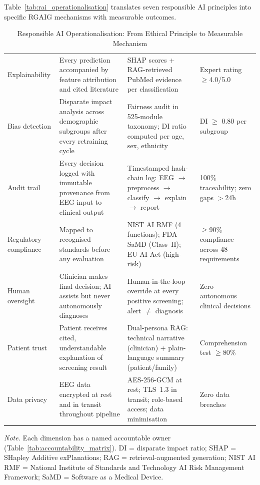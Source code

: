 Table~\ref{tab:rai_operationalisation} translates seven responsible AI principles into specific RGAIG mechanisms with measurable outcomes.

\begin{table}[H]
\tablestripes
\tablefontsize
\caption[Responsible AI Operationalisation]{Responsible AI Operationalisation: From Ethical Principle to Measurable Mechanism}
\begin{tabularx}{\textwidth}{@{} p{2cm} L L p{2.5cm} @{}}
\toprule
{} &  &  &  \\
\midrule
Explainability & Every prediction accompanied by feature attribution and cited literature & SHAP scores + RAG-retrieved PubMed evidence per classification & Expert rating $\geq$4.0/5.0 \\
\addlinespace
Bias detection & Disparate impact analysis across demographic subgroups after every retraining cycle & Fairness audit in 525-module taxonomy; DI ratio computed per age, sex, ethnicity & DI $\geq$ 0.80 per subgroup \\
\addlinespace
Audit trail & Every decision logged with immutable provenance from EEG input to clinical output & Timestamped hash-chain log: EEG $\to$ preprocess $\to$ classify $\to$ explain $\to$ report & 100\% traceability; zero gaps $>$24h \\
\addlinespace
Regulatory compliance & Mapped to recognised standards before any evaluation & NIST AI RMF (4 functions); FDA SaMD (Class~II); EU AI Act (high-risk) & $\geq$90\% compliance across 48 requirements \\
\addlinespace
Human oversight & Clinician makes final decision; AI assists but never autonomously diagnoses & Human-in-the-loop override at every positive screening; alert $\neq$ diagnosis & Zero autonomous clinical decisions \\
\addlinespace
Patient trust & Patient receives cited, understandable explanation of screening result & Dual-persona RAG: technical narrative (clinician) + plain-language summary (patient/family) & Comprehension test $\geq$80\% \\
\addlinespace
Data privacy & EEG data encrypted at rest and in transit throughout pipeline & AES-256-GCM at rest; TLS~1.3 in transit; role-based access; data minimisation & Zero data breaches \\
\bottomrule
\end{tabularx}
\vspace{0.5em}\noindent\textit{Note.} Each dimension has a named accountable owner (Table~\ref{tab:accountability_matrix}). DI = disparate impact ratio; SHAP = SHapley Additive exPlanations; RAG = retrieval-augmented generation; NIST AI RMF = National Institute of Standards and Technology AI Risk Management Framework; SaMD = Software as a Medical Device.
\end{table}

